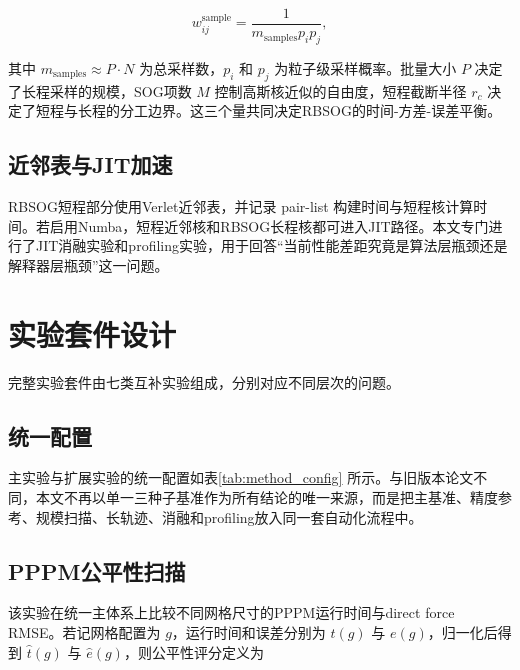 \begin{equation}
w^{\mathrm{sample}}_{ij} = \frac{1}{m_{\mathrm{samples}} p_i p_j},
\label{eq:method_importance}
\end{equation}

其中 $m_{\mathrm{samples}} \approx P\cdot N$ 为总采样数，$p_i$ 和 $p_j$ 为粒子级采样概率。批量大小 $P$ 决定了长程采样的规模，SOG项数 $M$ 控制高斯核近似的自由度，短程截断半径 $r_c$ 决定了短程与长程的分工边界。这三个量共同决定RBSOG的时间-方差-误差平衡\cite{jin2020random,guo2025sum}。

\subsection{近邻表与JIT加速}

RBSOG短程部分使用Verlet近邻表，并记录 pair-list 构建时间与短程核计算时间。若启用Numba，短程近邻核和RBSOG长程核都可进入JIT路径。本文专门进行了JIT消融实验和profiling实验，用于回答“当前性能差距究竟是算法层瓶颈还是解释器层瓶颈”这一问题。

\section{实验套件设计}

完整实验套件由七类互补实验组成，分别对应不同层次的问题。

\subsection{统一配置}

主实验与扩展实验的统一配置如表\ref{tab:method_config} 所示。与旧版本论文不同，本文不再以单一三种子基准作为所有结论的唯一来源，而是把主基准、精度参考、规模扫描、长轨迹、消融和profiling放入同一套自动化流程中。

\begin{table}[htbp]
\centering
\caption{Thesis套件的核心配置摘要}
\label{tab:method_config}
\resizebox{0.92\textwidth}{!}{%

}
\end{table}

\subsection{PPPM公平性扫描}

该实验在统一主体系上比较不同网格尺寸的PPPM运行时间与direct force RMSE。若记网格配置为 $g$，运行时间和误差分别为 $t(g)$ 与 $e(g)$，归一化后得到 $\hat t(g)$ 与 $\hat e(g)$，则公平性评分定义为

